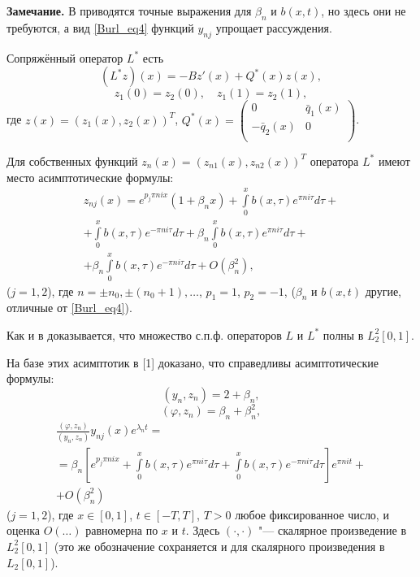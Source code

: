 \textbf{Замечание.} В \cite{Burl7}  приводятся точные выражения для
${{\beta }_{n}}$ и $b(x,t)$, но здесь они не требуются, а вид
\eqref{Burl_eq4} функций ${{y}_{nj}}$ упрощает рассуждения.

Сопряжённый оператор ${{L}^{*}}$ есть
    $$({{L}^{*}}z)(x)=-B{z}'(x)+{{Q}^{*}}(x)z(x),$$
    $${{z}_{1}}(0)={{z}_{2}}(0), \quad  {{z}_{1}}(1)={{z}_{2}}(1),$$
где  $z(x)={{({{z}_{1}}(x),{{z}_{2}}(x))}^{T}}$,
${{Q}^{*}}(x)=\left( \begin{matrix}
   0 & {{{\bar{q}}}_{1}}(x)  \\
   -{{{\bar{q}}}_{2}}(x) & 0  \\
\end{matrix} \right)$.


Для собственных функций
${{z}_{n}}(x)={{({{z}_{n1}}(x),{{z}_{n2}}(x))}^{T}}$ оператора
${{L}^{*}}$ имеют место асимптотические формулы:
\begin{multline*}
    {{z}_{nj}}(x)=
    {{e}^{{{p}_{j}}\pi nix}}\left( 1+{{\beta }_{n}}x \right)
    +\int\limits_{0}^{x}{b(x,\tau ){{e}^{\pi ni\tau }}d\tau }+
    \\+
    \int\limits_{0}^{x}{b(x,\tau ){{e}^{-\pi ni\tau }}d\tau }+
    {{\beta }_{n}}\int\limits_{0}^{x}{b(x,\tau ){{e}^{\pi ni\tau }}d\tau }+
    \\+
    {{\beta }_{n}}\int\limits_{0}^{x}{b(x,\tau ){{e}^{-\pi ni\tau }}d\tau }+O(\beta _{n}^{2}),
\end{multline*}
 ($j=1,2$), где $n=\pm {{n}_{0}},\pm ({{n}_{0}}+1),\ldots $, ${{p}_{1}}=1$, ${{p}_{2}}=-1$, (${{\beta }_{n}}$ и $b(x,t)$ другие, отличные от \eqref{Burl_eq4}).


Как и в \cite{Burl-SGU-16} доказывается, что множество с.п.ф.
операторов $L$ и $L^*$ полны в $L_2^2[0,1]$.





На базе этих асимптотик  в [1] доказано, что справедливы
асимптотические формулы:
$$({{y}_{n}},{{z}_{n}})=2+{{\beta }_{n}},$$
$$(\varphi ,{{z}_{n}})= {{\beta }_{n}}+{{\beta }_{n}^2},$$
\begin{multline*}
	\frac{(\varphi ,{{z}_{n}})}{({{y}_{n}},{{z}_{n}})}{{y}_{nj}}(x){{e}^{{{\lambda }_{n}}t}}=
	\\=
	{{\beta }_{n}}\left[ {{e}^{{{p}_{j}}\pi nix}}+
	\int\limits_{0}^{x}{b(x,\tau ){{e}^{\pi ni\tau }}d\tau
	}+\int\limits_{0}^{x}{b(x,\tau ){{e}^{-\pi ni\tau }}d\tau }
	\right]e^{\pi nit}+
	\\+
	O({{\beta }_{n}^2})
\end{multline*}
 ($j=1,2$),
где $x\in [0,1]$, $t\in [-T,T]$, $T>0$ любое фиксированное число, и
оценка $O(\ldots )$ равномерна по $x$ и $t$. Здесь   $(\cdot ,\cdot
)$ "--- скалярное произведение в $L_{2}^{2}[0,1]$ (это же обозначение
сохраняется и для скалярного произведения в ${{L}_{2}}[0,1]$).



